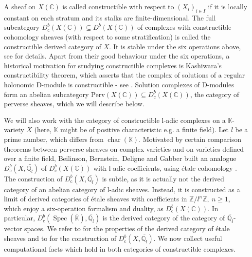 \documentclass[11pt,english]{article}
\numberwithin{equation}{section}
\numberwithin{figure}{section}
\theoremstyle{definition}
\theoremstyle{plain}
\theoremstyle{remark}
\DeclareMathOperator{\ch}{char}
\DeclareMathOperator{\Spec}{Spec}
\newcommand\ZZ{\mathbb{Z}}
\newcommand\QQ{\mathbb{Q}}
\newcommand\KK{\mathbb{K}}
\newcommand\CC{\mathbb{C}}
\begin{document}
A sheaf on $X(\CC)$ is called constructible with respect to $(X_{i})_{i\in I}$
if it is locally constant on each stratum and its stalks are finite-dimensional.
The full subcategory $D_{\mathrm{c}}^{b}(X(\CC))\subseteq D^{b}(X(\CC))$
of complexes with constructible cohomology sheaves (with respect to
some stratification) is called the constructible derived category
of $X$. It is stable under the six operations above, see \cite[Ch. 4.]{Dim04}
for details. Apart from their good behaviour under the six operations,
a historical motivation for studying constructible complexes is Kashiwara's
constructibility theorem, which asserts that the complex of solutions
of a regular holonomic D-module is constructible - see \cite[\S 5.3.]{Dim04}.
Solution complexes of D-modules form an abelian subcategory $\mathrm{Perv}(X(\CC))\subseteq D_{\mathrm{c}}^{b}(X(\CC))$,
the category of perverse sheaves, which we will describe below.

We will also work with the category of constructible l-adic complexes
on a $\KK$-variety $X$ (here, $\KK$ might be of positive characteristic
e.g. a finite field). Let $l$ be a prime number, which differs from
$\ch(\KK)$. Motivated by certain comparison theorems between perverse
sheaves on complex varieties and on varieties defined over a finite
field, Beilinson, Bernstein, Deligne and Gabber built an analogue
$D_{\mathrm{c}}^{b}(X,\bar{\QQ_{l}})$ of $D_{\mathrm{c}}^{b}(X(\CC))$
with l-adic coefficients, using étale cohomology \cite{BBDG18}. The
construction of $D_{\mathrm{c}}^{b}(X,\bar{\QQ_{l}})$ is subtle,
as it is actually not the derived category of an abelian category
of l-adic sheaves. Instead, it is constructed as a limit of derived
categories of étale sheaves with coefficients in $\ZZ/l^{n}\ZZ,\ n\geq1$,
which enjoy a six-operation formalism and duality, as $D_{\mathrm{c}}^{b}(X(\CC))$.
In particular, $D_{\mathrm{c}}^{b}(\Spec(\bar{\KK}),\bar{\QQ_{l}})$
is the derived category of the category of $\bar{\QQ_{l}}$-vector
spaces. We refer to \cite[Ch. 59, 63]{SP} for the properties of the
derived category of étale sheaves and to \cite{KW01} for the construction
of $D_{\mathrm{c}}^{b}(X,\bar{\QQ_{l}})$. We now collect useful computational
facts which hold in both categories of constructible complexes. \index[notations]{d@$D_{\mathrm{c}}^{b}(X,\bar{\QQ_{l}})$ - category of l-adic complexes}
\end{document}
